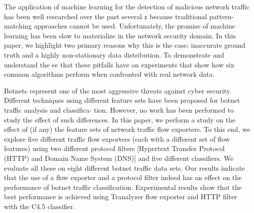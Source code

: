 \documentclass[10pt,journal,compsoc]{IEEEtran}
\begin{document}
\cite{Anderson2017}

The application of machine learning for the detection of malicious
network traffic has been well researched over the past several
z%
because traditional pattern-matching approaches cannot be used.
Unfortunately, the promise of machine learning has been slow to
materialize  in  the  network  security  domain.  In  this  paper,  we
highlight two primary reasons why this is the case: inaccurate
ground truth and a highly non-stationary data distribution. To
demonstrate and understand the ee that these pitfalls have on
experiments that show how six common algorithms perform when
confronted with real network data.


\cite{Haddadi2016}
Botnets represent one of the most aggressive threats
against cyber security. Different techniques using different feature
sets have been proposed for botnet traffic analysis and classifica-
tion. However, no work has been performed to study the effect of
such differences. In this paper, we perform a study on the effect of
(if any) the feature sets of network traffic flow exporters. To this
end, we explore five different traffic flow exporters (each with a
different set of flow features) using two different protocol filters
[Hypertext Transfer Protocol (HTTP) and Domain Name System
(DNS)] and five different classifiers. We evaluate all these on eight
different botnet traffic data sets. Our results indicate that the use
of a flow exporter and a protocol filter indeed has an effect on the
performance of botnet traffic classification. Experimental results
show that the best performance is achieved using Tranalyzer flow
exporter and HTTP filter with the C4.5 classifier.

\cite{Loo2016}
\end{document}
